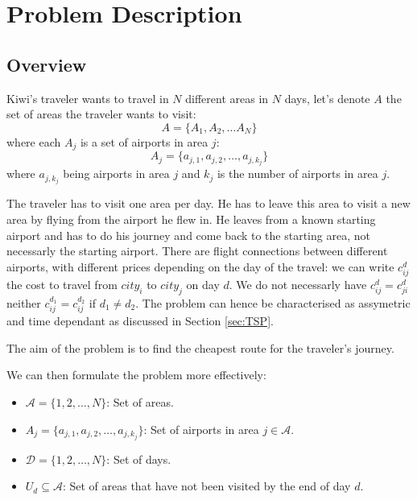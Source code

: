 \chapter{Problem Description}
\label{Chapter3}

\section{Overview}

Kiwi's traveler wants to travel in $N$ different areas in $N$ days, let's denote $A$ the set of areas the traveler wants to visit: \[A=\{A_{1}, A_{2}, \ldots A_{{N}}\}\]
where each \(A_{j}\) is a set of airports in area \(j\):
\[
    A_{j} = \{ a_{j,1}, a_{j,2}, \ldots, a_{j,k_j} \}
\]
where \( a_{j,k_j} \) being airports in area \(j\) and \(k_j\) is the number of airports in area \(j\).

The traveler has to visit one area per day. He has to leave this area to visit a new area by flying from the airport he flew in.
He leaves from a known starting airport and has to do his journey and come back to the starting area, not necessarly the starting airport.
There are flight connections between different airports, with different prices depending on the day of the travel:
we can write $c^{d}_{ij}$ the cost to travel from $city_i$ to $city_j$ on day $d$. We do not necessarly have $c^{d}_{ij}=c^{d}_{ji}$ neither $c^{d_1}_{ij}=c^{d_2}_{ij}$ if $d_1 \neq d_2$. The problem can hence be characterised as assymetric and time dependant as discussed in Section \ref{sec:TSP}.

The aim of the problem is to find the cheapest route for the traveler's journey.

We can then formulate the problem more effectively:

\begin{itemize}
    \item $\mathcal{A} = \{1, 2, \ldots, N\}$: Set of areas.
    \item $A_j = \{a_{j,1}, a_{j,2}, \ldots, a_{j,k_j}\}$: Set of airports in area $j \in \mathcal{A}$.
    \item $\mathcal{D} = \{1, 2, \ldots, N\}$: Set of days.
    \item $U_d \subseteq \mathcal{A}$: Set of areas that have not been visited by the end of day $d$.
\end{itemize}

